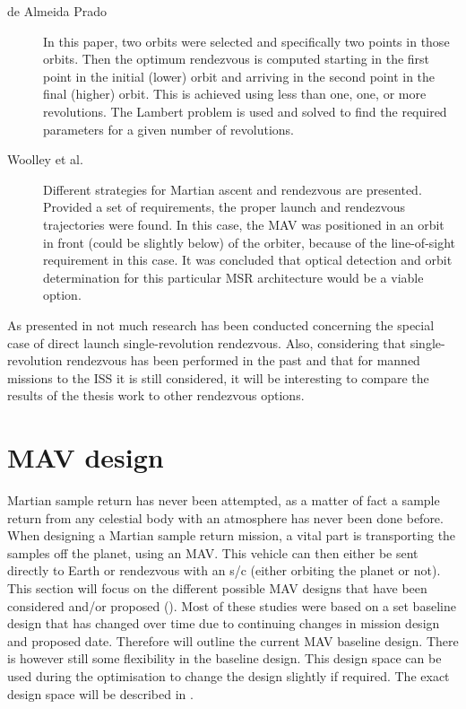 \begin{description}
\item[de Almeida Prado \cite{almeidaprado1996optimal}] In this paper, two orbits were selected and specifically two points in those orbits. Then the optimum rendezvous is computed starting in the first point in the initial (lower) orbit and arriving in the second point in the final (higher) orbit. This is achieved using less than one, one, or more revolutions. The Lambert problem is used and solved to find the required parameters for a given number of revolutions.  
\item[Woolley et al. \cite{woolley2011mars}] Different strategies for Martian ascent and rendezvous are presented. Provided a set of requirements, the proper launch and rendezvous trajectories were found. In this case, the \ac{MAV} was positioned in an orbit in front (could be slightly below) of the orbiter, because of the line-of-sight requirement in this case. It was concluded that optical detection and orbit determination for this particular \ac{MSR} architecture would be a viable option.
\end{description}

As presented in  not much research has been conducted concerning the special case of direct launch single-revolution rendezvous. Also, considering that single-revolution rendezvous has been performed in the past and that for manned missions to the \ac{ISS} it is still considered, it will be interesting to compare the results of the thesis work to other rendezvous options.




\section{\ac{MAV} design}
\label{sec:mav_des}
Martian sample return has never been attempted, as a matter of fact a sample return from any celestial body with an atmosphere has never been done before. When designing a Martian sample return mission, a vital part is transporting the samples off the planet, using an \ac{MAV}. This vehicle can then either be sent directly to Earth or rendezvous with an \ac{s/c} (either orbiting the planet or not). This section will focus on the different possible \ac{MAV} designs that have been considered and/or proposed (). Most of these studies were based on a set baseline design that has changed over time due to continuing changes in mission design and proposed date. Therefore  will outline the current \ac{MAV} baseline design. There is however still some flexibility in the baseline design. This design space can be used during the optimisation to change the design slightly if required. The exact design space will be described in .

